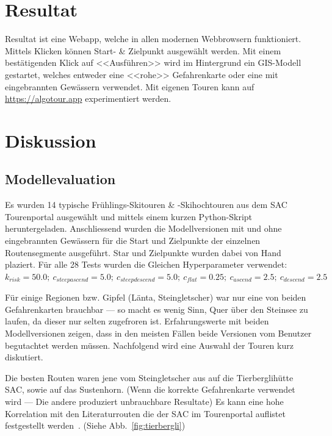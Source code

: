 \section{Resultat}

Resultat ist eine Webapp, welche in allen modernen Webbrowsern funktioniert. Mittels Klicken können Start- \& Zielpunkt ausgewählt werden. Mit einem bestätigenden Klick auf <<Ausführen>> wird im Hintergrund ein GIS-Modell gestartet, welches entweder eine <<rohe>> Gefahrenkarte oder eine mit eingebrannten Gewässern verwendet. Mit eigenen Touren kann auf \url{https://algotour.app} experimentiert werden.

\section{Diskussion}

\subsection{Modellevaluation}

Es wurden 14 typische Frühlings-Skitouren \& -Skihochtouren aus dem SAC Tourenportal ausgewählt und mittels einem kurzen Python-Skript heruntergeladen. Anschliessend wurden die Modellversionen mit und ohne eingebrannten Gewässern für die Start und Zielpunkte der einzelnen Routensegmente ausgeführt. Star und Zielpunkte wurden dabei von Hand plaziert. Für alle 28 Tests wurden die Gleichen Hyperparameter verwendet: $k_{risk}={50.0};\ c_{steepascend}={5.0};\ c_{steepdescend}={5.0};\ c_{flat}={0.25};\ c_{ascend}={2.5};\ c_{descend}={2.5}$

Für einige Regionen bzw. Gipfel (Länta, Steingletscher) war nur eine von beiden Gefahrenkarten brauchbar --- so macht es wenig Sinn, Quer über den Steinsee zu laufen, da dieser nur selten zugefroren ist. Erfahrungswerte mit beiden Modellversionen zeigen, dass in den meisten Fällen beide Versionen vom Benutzer begutachtet werden müssen.
Nachfolgend wird eine Auswahl der Touren kurz diskutiert.

Die besten Routen waren jene vom Steingletscher aus auf die Tierberglihütte SAC, sowie auf das Sustenhorn. (Wenn die korrekte Gefahrenkarte verwendet wird --- Die andere produziert unbrauchbare Resultate) Es kann eine hohe Korrelation mit den Literaturrouten die der SAC im Tourenportal auflistet festgestellt werden~\cite{mmzentralch}. (Siehe Abb.\ \ref{fig:tierbergli})

